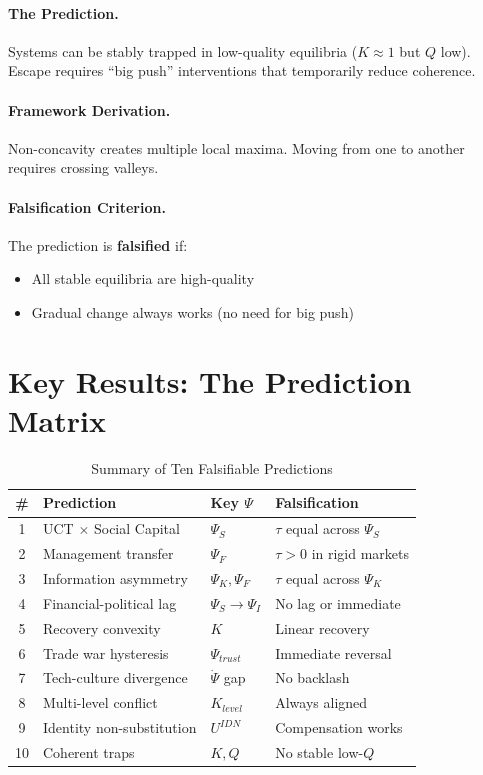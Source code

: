 \paragraph{The Prediction.}
Systems can be stably trapped in low-quality equilibria ($K \approx 1$ but $Q$ low). Escape requires ``big push'' interventions that temporarily reduce coherence.

\paragraph{Framework Derivation.}
Non-concavity creates multiple local maxima. Moving from one to another requires crossing valleys.

\paragraph{Falsification Criterion.}
The prediction is \textbf{falsified} if:
\begin{itemize}
    \item All stable equilibria are high-quality
    \item Gradual change always works (no need for big push)
\end{itemize}


\section{Key Results: The Prediction Matrix}
\label{sec:S-results}

\begin{table}[htbp]
\centering
\caption{Summary of Ten Falsifiable Predictions}
\label{tab:S-predictions}
\renewcommand{\arraystretch}{1.2}
\begin{tabular}{@{}clll@{}}
\toprule
\textbf{\#} & \textbf{Prediction} & \textbf{Key $\Psi$} & \textbf{Falsification} \\
\midrule
1 & UCT $\times$ Social Capital & $\Psi_S$ & $\tau$ equal across $\Psi_S$ \\
2 & Management transfer & $\Psi_F$ & $\tau > 0$ in rigid markets \\
3 & Information asymmetry & $\Psi_K, \Psi_F$ & $\tau$ equal across $\Psi_K$ \\
4 & Financial-political lag & $\Psi_S \to \Psi_I$ & No lag or immediate \\
5 & Recovery convexity & $K$ & Linear recovery \\
6 & Trade war hysteresis & $\Psi_{trust}$ & Immediate reversal \\
7 & Tech-culture divergence & $\dot{\Psi}$ gap & No backlash \\
8 & Multi-level conflict & $K_{level}$ & Always aligned \\
9 & Identity non-substitution & $U^{IDN}$ & Compensation works \\
10 & Coherent traps & $K, Q$ & No stable low-$Q$ \\
\bottomrule
\end{tabular}
\end{table}

